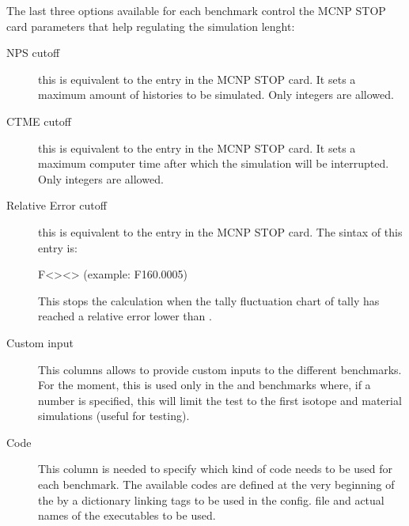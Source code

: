 \documentclass[letterpaper,10pt,english]{sphinxmanual}
\begin{document}
The last three options available for each benchmark control the MCNP STOP card parameters
that help regulating the simulation lenght:
\begin{description}
\item[{NPS cut\sphinxhyphen{}off}] \leavevmode
this is equivalent to the  entry in the MCNP STOP card. It sets a maximum amount
of histories to be simulated. Only integers are allowed.

\item[{CTME cut\sphinxhyphen{}off}] \leavevmode
this is equivalent to the  entry in the MCNP STOP card. It sets a maximum computer
time after which the simulation will be interrupted. Only integers are allowed.

\item[{Relative Error cut\sphinxhyphen{}off}] \leavevmode
this is equivalent to the  entry in the MCNP STOP card. The sintax of this entry is:

F\textless{}\textgreater{}\sphinxhyphen{}\textless{}\textgreater{}  (example: F16\sphinxhyphen{}0.0005)

This stops the calculation when the tally fluctuation chart of tally  has reached a
relative error lower than .

\item[{Custom input}] \leavevmode
{}This columns allows to provide custom inputs to the different benchmarks. For the
moment, this is used only in the  and  benchmarks where,
if a number  is specified, this will limit the test to the first  isotope and
material simulations (useful for testing).

\item[{Code}] \leavevmode
{}This column is needed to specify which kind of code needs to be used for each benchmark.
The available codes are defined at the very beginning of the 
by a dictionary linking tags to be used in the config. file and actual names of the executables
to be used.

\begin{sphinxVerbatim}[commandchars=\\\{\}]
     
\end{sphinxVerbatim}

\end{description}
\end{document}
